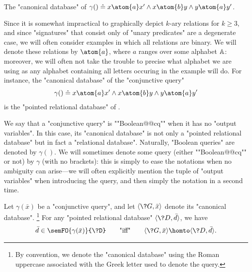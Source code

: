 \begin{marginfigure}
	\centering
	\caption{\AP\label{fig:prelim-db-ex-db}
	The "canonical database" of $\gamma() \defeq x \atom{a} x' \land x \atom{b} y \land y \atom{a} y'$.}
\end{marginfigure}
Since it is somewhat impractical to graphically depict $k$-ary relations for $k \geq 3$,
and since "signatures" that consist only of "unary predicates" are a degenerate case,
we will often consider examples in which all relations are binary.
We will denote these relations by $\atom{a}$, where $a$ ranges over some alphabet $\mathbb{A}$:
moreover, we will often not take the trouble to precise what alphabet we are using
as any alphabet containing all letters occuring in the example will do.
For instance, the "canonical database" of the "conjunctive query"
\[
	\gamma() \defeq x \atom{a} x' \land x \atom{b} y \land y \atom{a} y'
\]
is the "pointed relational database" of .

We say that a "conjunctive query" is ""Boolean@@cq"" when it has no "output variables".
In this case, its "canonical database" is not only a "pointed relational database" but
in fact a "relational database".
Naturally, "Boolean queries" are denoted by $\gamma()$.
We will sometimes denote some query (either ""Boolean@@cq"" or not)
by $\gamma$ (with no brackets): this is simply to ease the notations when
no ambiguity can arise---we will often explicitly mention the tuple of "output variables"
when introducing the query, and then simply the notation in a second time.

\begin{proposition}[""Duality""]
	\AP\label{prop:duality}
	Let $\gamma(\bar x)$ be a "conjunctive query",
	and let $\tup{\?G, \bar x}$ denote its "canonical database".%
	\footnote{By convention, we denote the "canonical database" using the Roman
	uppercase associated with the Greek letter used to denote
	the query.}
	For any "pointed relational database" $\tup{\?D, \bar d}$,
	we have
	\[
		\bar d \in \semFO{\gamma(\bar x)}{\?D}
		\qquad\text{"iff"}\qquad
		\tup{\?G, \bar x} \homto \tup{\?D, \bar d}.
	\]
\end{proposition}

